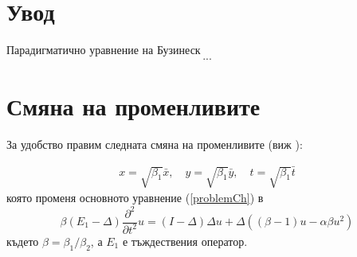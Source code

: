 \documentclass{article}
\newcommand{\be}{\begin{equation}}
\newcommand{\ee}{\end{equation}}
\newcommand{\rf}[1]{(\ref{#1})}
\begin{document}
\bigskip



\section{Увод}
Парадигматично уравнение на Бузинеск
\be\label{problemCh}
...
\ee


\section{Смяна на променливите}

За удобство правим следната смяна на променливите (виж \cite{ref25}):

\begin{align}
x = \sqrt{\beta_1} \bar{x}, \quad y = \sqrt{\beta_1} \bar{y}, \quad t = \sqrt{\beta_1} \bar{t} \nonumber
\end{align}
която променя основното уравнение \rf{problemCh} в
\be\label{problemVC}
 \beta (E_1-\Delta) \frac{\partial^2}{\partial t^2}u= 
(I-\Delta)\Delta u +\Delta( (\beta - 1 )u - \alpha \beta u^2 )
\ee
където $\beta = \beta_1/\beta_2$, а $E_1$ е тъждествения оператор. 
\end{document}
